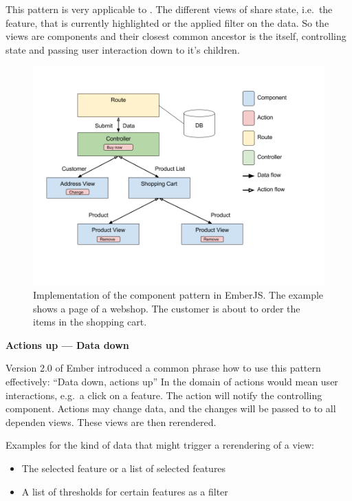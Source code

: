 This pattern is very applicable to \cmvs{}.
The different views of \cmvs{} share state, i.e.\ the feature, that is currently highlighted or the applied filter on the data.
So the views are components and their closest common ancestor is the \cmv{} itself, controlling state and passing user interaction down to it's children.

\begin{figure}[ht]
  \centering
  \includegraphics[width=\textwidth]{images/data-down-actions-up.png}
  \caption{%
    Implementation of the component pattern in EmberJS\@.
    The example shows a page of a webshop.
    The customer is about to order the items in the shopping cart.
  }\label{fig:implementation:data-down-actions-up}
\end{figure}

\textbf{Actions up --- Data down}

Version 2.0 of Ember introduced a common phrase how to use this pattern effectively: ``Data down, actions up''\cite{Emberigniter2017}
In the domain of \cmvs{} actions would mean user interactions, e.g.\ a click on a feature.
The action will notify the controlling \cmv{} component.
Actions may change data, and the changes will be passed to to all dependen views.
These views are then rerendered.

Examples for the kind of data that might trigger a rerendering of a view:
\begin{itemize}
  \item
    The selected feature or a list of selected features
  \item
    A list of thresholds for certain features as a filter
\end{itemize}



